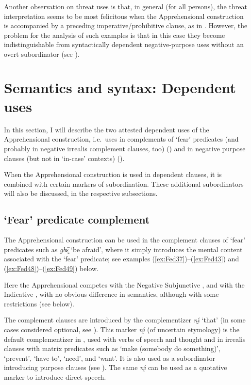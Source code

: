 \documentclass[output=paper,colorlinks,citecolor=brown]{langscibook}
\begin{document}
 Another observation on threat uses is that, in general (for all persons), the threat interpretation seems to be most felicitous when the Apprehensional construction is accompanied by a preceding imperative\slash prohibitive clause, as in . However, the problem for the analysis of such examples is that in this case they become indistinguishable from syntactically dependent negative-purpose uses without an overt subordinator (see ).



\section{Semantics and syntax: Dependent uses}
\label{sec:fedotov:synsemdependent}

In this section, I will describe the two attested dependent uses of the Apprehensional construction, i.e.\ uses in complements of `fear' predicates (and probably in negative irrealis complement clauses, too) () and in negative purpose clauses (but not in `in-case' contexts) ().

When the Apprehensional construction is used in dependent clauses, it is combined with certain markers of subordination. These additional subordinators will also be discussed, in the respective subsections.

\subsection{`Fear' predicate complement}
\label{subsec:fearpredicate}

The Apprehensional construction can be used in the complement clauses of `fear' predicates such as \textit{gbɛ̰̏} `be afraid', where it simply introduces the mental content associated with the `fear' predicate; see examples (\ref{ex:Fed37})--(\ref{ex:Fed43}) and (\ref{ex:Fed48})--(\ref{ex:Fed49}) below.

Here the Apprehensional competes with the Negative Subjunctive ,  and with the Indicative ,  with no obvious difference in semantics, although with some restrictions (see below).

The complement clauses are introduced by the complementizer \textit{nı̰́} `that' (in some cases considered optional, see ). This marker \textit{nı̰́} (of uncertain etymology) is the default complementizer in , used with verbs of speech and thought and in irrealis clauses with matrix predicates such as `make (somebody do something)', `prevent', `have to', `need', and `want'. It is also used as a subordinator introducing purpose clauses (see ). The same \textit{nı̰́} can be used as a quotative marker to introduce direct speech.
\end{document}
